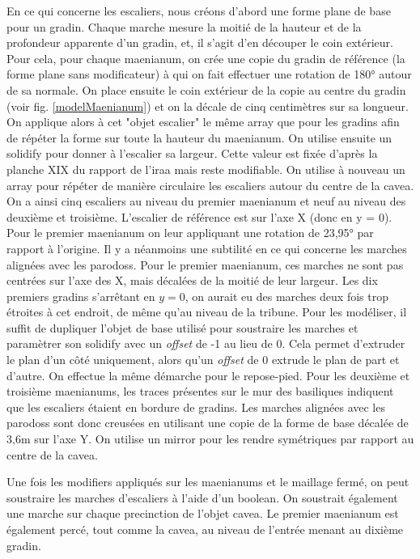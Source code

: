 En ce qui concerne les escaliers, nous créons d'abord une forme plane de base pour un gradin. Chaque marche mesure la moitié de la hauteur et de la profondeur apparente d'un gradin, et, il s'agit d'en découper le coin extérieur. Pour cela, pour chaque \gls{maenianum}, on crée une copie du gradin de référence (la forme plane sans modificateur) à qui on fait effectuer une rotation de 180° autour de sa normale. On place ensuite le coin extérieur de la copie au centre du gradin (voir fig. \ref{modelMaenianum}) et on la décale de cinq centimètres sur sa longueur. On applique alors à cet "objet escalier" le même \gls{array} que pour les gradins afin de répéter la forme sur toute la hauteur du  \gls{maenianum}. On utilise ensuite un \gls{solidify} pour donner à l'escalier sa largeur. Cette valeur est fixée d'après la planche XIX du rapport de l'\gls{iraa} \cite[Pl. XIX]{orangePl} mais reste modifiable. On utilise à nouveau un \gls{array} pour répéter de manière circulaire les escaliers autour du centre de la \gls{cavea}. On a ainsi cinq escaliers au niveau du premier \gls{maenianum} et neuf au niveau des deuxième et troisième. L'escalier de référence est sur l'axe X (donc en y = 0). Pour le premier \gls{maenianum} on leur appliquant une rotation de 23,95° par rapport à l'origine. Il y a néanmoins une subtilité en ce qui concerne les marches alignées avec les \glspl{parodos}. Pour le premier \gls{maenianum}, ces marches ne sont pas centrées sur l'axe des X, mais décalées de la moitié de leur largeur. Les dix premiers gradins s'arrêtant en $y = 0$, on aurait eu des marches deux fois trop étroites à cet endroit, de même qu'au niveau de la tribune. Pour les modéliser, il suffit de dupliquer l'objet de base utilisé pour soustraire les marches et paramètrer son \gls{solidify} avec un \textit{offset} de -1 au lieu de 0. Cela permet d'extruder le plan d'un côté uniquement, alors qu'un \textit{offset} de 0 extrude le plan de part et d'autre. On effectue la même démarche pour le repose-pied. Pour les deuxième et troisième \glspl{maenianum}, les traces présentes sur le mur des basiliques indiquent que les escaliers étaient en bordure de gradins. Les marches alignées avec les \glspl{parodos} sont donc creusées en utilisant une copie de la forme de base décalée de 3,6m sur l'axe Y. On utilise un \gls{mirror} pour les rendre symétriques par rapport au centre de la \gls{cavea}.

Une fois les \glspl{modifier} appliqués sur les \glspl{maenianum} et le maillage fermé, on peut soustraire les marches d'escaliers à l'aide d'un \gls{boolean}. On soustrait également une marche sur chaque \gls{precinction} de l'objet \gls{cavea}. Le premier \gls{maenianum} est également percé, tout comme la \gls{cavea}, au niveau de l'entrée menant au dixième gradin.

